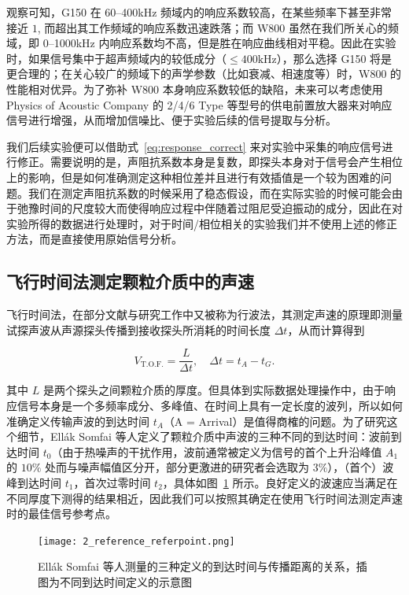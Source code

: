 观察可知，G150 在 \numrange{60}{400}\unit{\kilo\hertz} 频域内的响应系数较高，在某些频率下甚至非常接近 $1$, 而超出其工作频域的响应系数迅速跌落；而 W800 虽然在我们所关心的频域，即 \numrange{0}{1000}\unit{\kilo\hertz} 内响应系数均不高，但是胜在响应曲线相对平稳。因此在实验时，如果信号集中于超声频域内的较低成分（$\leq 400\unit{\kilo\hertz}$），那么选择 G150 将是更合理的；在关心较广的频域下的声学参数（比如衰减、相速度等）时，W800 的性能相对优异。为了弥补 W800 本身响应系数较低的缺陷，未来可以考虑使用 Physics of Acoustic Company 的 2/4/6 Type 等型号的供电前置放大器来对响应信号进行增强，从而增加信噪比、便于实验后续的信号提取与分析。

我们后续实验便可以借助式~\eqref{eq:response_correct} 来对实验中采集的响应信号进行修正。需要说明的是，声阻抗系数本身是复数，即探头本身对于信号会产生相位上的影响，但是如何准确测定这种相位差并且进行有效插值是一个较为困难的问题。我们在测定声阻抗系数的时候采用了稳态假设，而在实际实验的时候可能会由于弛豫时间的尺度较大而使得响应过程中伴随着过阻尼受迫振动的成分，因此在对实验所得的数据进行处理时，对于时间/相位相关的实验我们并不使用上述的修正方法，而是直接使用原始信号分析。

\subsection{飞行时间法测定颗粒介质中的声速}\label{sec:tof}

飞行时间法，在部分文献与研究工作中又被称为行波法，其测定声速的原理即测量试探声波从声源探头传播到接收探头所消耗的时间长度 $\Delta t$，从而计算得到

\begin{equation}
  V_{\text{T.O.F.}} = \frac{L}{\Delta t},\quad \Delta t = t_{A} - t_{G}.
\end{equation}

其中 $L$ 是两个探头之间颗粒介质的厚度。但具体到实际数据处理操作中，由于响应信号本身是一个多频率成分、多峰值、在时间上具有一定长度的波列，所以如何准确定义传输声波的到达时间 $t_{A}$（A = Arrival）是值得商榷的问题。为了研究这个细节，Ellák Somfai 等人定义了颗粒介质中声波的三种不同的到达时间：波前到达时间 $t_{0}$（由于热噪声的干扰作用，波前通常被定义为信号的首个上升沿峰值 $A_{1}$ 的 $10\%$ 处而与噪声幅值区分开，部分更激进的研究者会选取为 $3\%$），（首个）波峰到达时间 $t_{1}$，首次过零时间 $t_{2}$，具体如图~\ref{fig:ref_reference_point} 所示\cite{PhysRevE.72.021301}。良好定义的波速应当满足在不同厚度下测得的结果相近，因此我们可以按照其确定在使用飞行时间法测定声速时的最佳信号参考点。

\begin{figure}[!htp]
  \centering
  \texttt{[image: 2\_reference\_referpoint.png]}
  \caption{Ellák Somfai 等人测量的三种定义的到达时间与传播距离的关系，插图为不同到达时间定义的示意图}%
  \label{fig:ref_reference_point}
\end{figure}

